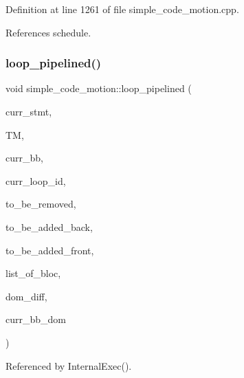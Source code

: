 Definition at line 1261 of file simple\+\_\+code\+\_\+motion.\+cpp.



References schedule.

\mbox{\label{classsimple__code__motion_a639c97e219cb7d49b9cb451b5085d3bb}} 
\subsubsection{\texorpdfstring{loop\+\_\+pipelined()}{loop\_pipelined()}}
{\footnotesize\ttfamily void simple\+\_\+code\+\_\+motion\+::loop\+\_\+pipelined (\begin{DoxyParamCaption}\item[{\hyperlink{tree__node_8hpp_a6ee377554d1c4871ad66a337eaa67fd5}{tree\+\_\+node\+Ref}}]{curr\+\_\+stmt,  }\item[{const \hyperlink{tree__manager_8hpp_a96ff150c071ce11a9a7a1e40590f205e}{tree\+\_\+manager\+Ref}}]{TM,  }\item[{unsigned int}]{curr\+\_\+bb,  }\item[{unsigned int}]{curr\+\_\+loop\+\_\+id,  }\item[{std\+::list$<$ \hyperlink{tree__node_8hpp_a6ee377554d1c4871ad66a337eaa67fd5}{tree\+\_\+node\+Ref} $>$ \&}]{to\+\_\+be\+\_\+removed,  }\item[{std\+::list$<$ \hyperlink{tree__node_8hpp_a6ee377554d1c4871ad66a337eaa67fd5}{tree\+\_\+node\+Ref} $>$ \&}]{to\+\_\+be\+\_\+added\+\_\+back,  }\item[{std\+::list$<$ \hyperlink{tree__node_8hpp_a6ee377554d1c4871ad66a337eaa67fd5}{tree\+\_\+node\+Ref} $>$ \&}]{to\+\_\+be\+\_\+added\+\_\+front,  }\item[{std\+::map$<$ unsigned int, bloc\+Ref $>$ \&}]{list\+\_\+of\+\_\+bloc,  }\item[{std\+::map$<$ std\+::pair$<$ unsigned int, bloc\+Ref $>$, std\+::pair$<$ unsigned int, bloc\+Ref $>$$>$ \&}]{dom\+\_\+diff,  }\item[{unsigned int}]{curr\+\_\+bb\+\_\+dom }\end{DoxyParamCaption})\hspace{0.3cm}{\ttfamily [private]}}



Referenced by Internal\+Exec().

